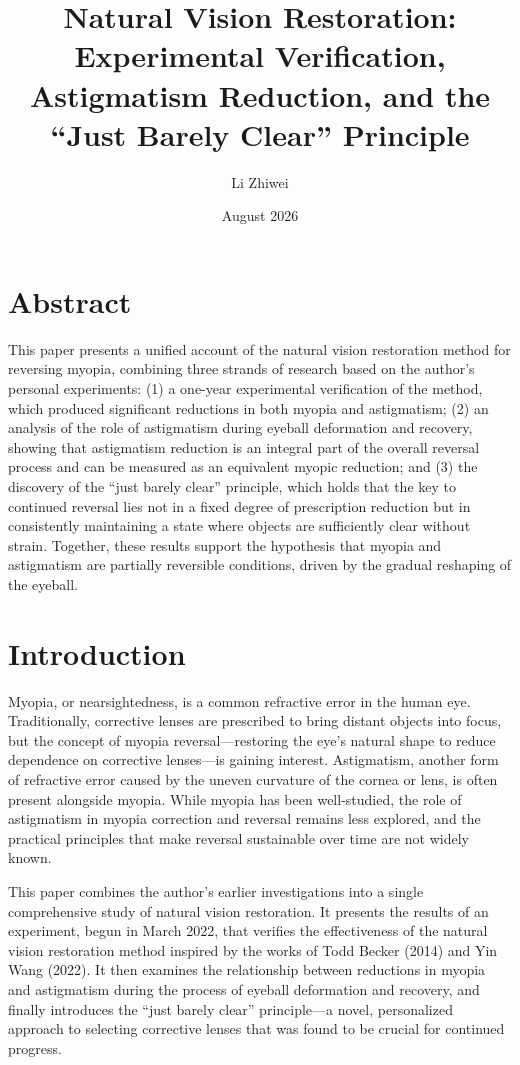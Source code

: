 \documentclass[12pt]{article}
\title{Natural Vision Restoration: Experimental Verification, Astigmatism Reduction, and the ``Just Barely Clear'' Principle}
\author{Li Zhiwei}
\date{August 2026}
\begin{document}
\maketitle

\tableofcontents

\section*{Abstract}
This paper presents a unified account of the natural vision restoration method for reversing myopia, combining three strands of research based on the author's personal experiments: (1) a one-year experimental verification of the method, which produced significant reductions in both myopia and astigmatism; (2) an analysis of the role of astigmatism during eyeball deformation and recovery, showing that astigmatism reduction is an integral part of the overall reversal process and can be measured as an equivalent myopic reduction; and (3) the discovery of the ``just barely clear'' principle, which holds that the key to continued reversal lies not in a fixed degree of prescription reduction but in consistently maintaining a state where objects are sufficiently clear without strain. Together, these results support the hypothesis that myopia and astigmatism are partially reversible conditions, driven by the gradual reshaping of the eyeball.

\section{Introduction}
Myopia, or nearsightedness, is a common refractive error in the human eye. Traditionally, corrective lenses are prescribed to bring distant objects into focus, but the concept of myopia reversal---restoring the eye's natural shape to reduce dependence on corrective lenses---is gaining interest. Astigmatism, another form of refractive error caused by the uneven curvature of the cornea or lens, is often present alongside myopia. While myopia has been well-studied, the role of astigmatism in myopia correction and reversal remains less explored, and the practical principles that make reversal sustainable over time are not widely known.

This paper combines the author's earlier investigations into a single comprehensive study of natural vision restoration. It presents the results of an experiment, begun in March 2022, that verifies the effectiveness of the natural vision restoration method inspired by the works of Todd Becker (2014) and Yin Wang (2022). It then examines the relationship between reductions in myopia and astigmatism during the process of eyeball deformation and recovery, and finally introduces the ``just barely clear'' principle---a novel, personalized approach to selecting corrective lenses that was found to be crucial for continued progress.
\end{document}
